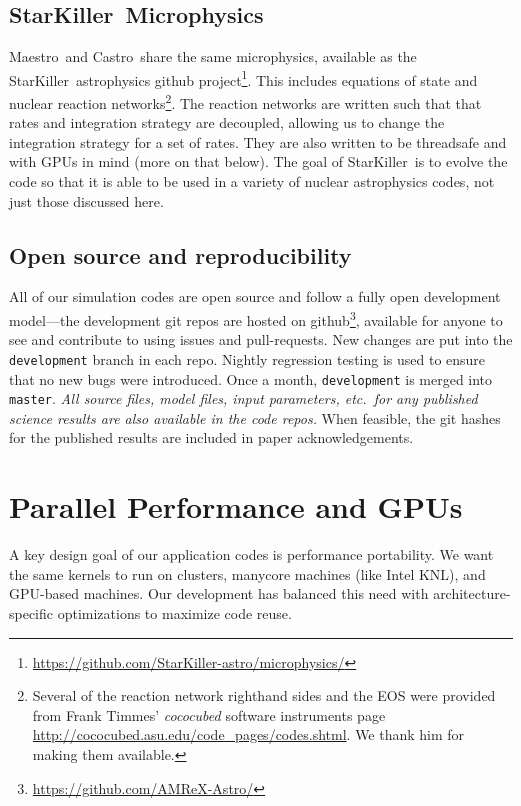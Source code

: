 \documentclass[letterpaper]{jpconf}
\newcommand{\maestro}{{\sffamily Maestro}}
\newcommand{\castro}{{\sffamily Castro}}
\newcommand{\starkiller}{{\sffamily StarKiller}}
\begin{document}
\subsection{\starkiller\ Microphysics}

\maestro\ and \castro\ share the same microphysics, available as the
\starkiller\ astrophysics github
project\footnote{\url{https://github.com/StarKiller-astro/microphysics/}}.
This includes equations of state and nuclear reaction
networks\footnote{Several of the reaction network righthand sides and
  the EOS were provided from Frank Timmes' {\em cococubed} software
  instruments page
  \url{http://cococubed.asu.edu/code_pages/codes.shtml}.  We thank him
  for making them available.}.  The reaction networks are written such
that that rates and integration strategy are decoupled, allowing us to
change the integration strategy for a set of rates.  They are also
written to be threadsafe and with GPUs in mind (more on that
below).  The goal of \starkiller\ is to evolve the code so that it is
able to be used in a variety of nuclear astrophysics codes, not just
those discussed here.


\subsection{Open source and reproducibility}

All of our simulation codes are open source and follow a fully open
development model---the development git repos are hosted on
github\footnote{\url{https://github.com/AMReX-Astro/}}, available for
anyone to see and contribute to using issues and pull-requests.
New changes are put into the {\tt development} branch in each repo.
Nightly regression testing is used to ensure that no new bugs were
introduced.  Once a month, {\tt development} is merged into {\tt
  master}.
{\em All source files, model files, input parameters, etc.\ for any
published science results are also available in the code repos.}  When
feasible, the git hashes for the published results are included in paper
acknowledgements.




\section{Parallel Performance and GPUs}


A key design goal of our application codes is performance portability.
We want the same kernels to run on clusters, manycore machines (like
Intel KNL), and GPU-based machines.  Our development has balanced this
need with architecture-specific optimizations to maximize code reuse.
\end{document}
